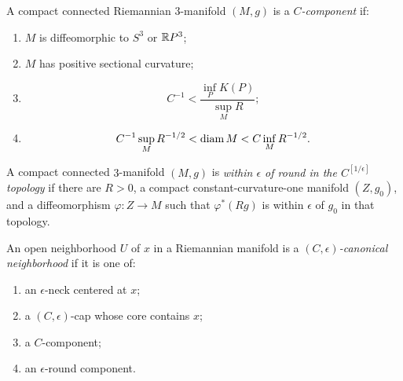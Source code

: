 \begin{definition}[$C$-component]\label{def:c-component}
\label{Ccomponent}
A compact connected Riemannian $3$-manifold $(M,g)$ is a
\emph{$C$-component} if:
\begin{enumerate}
\item[(1)] $M$ is diffeomorphic to $S^3$ or $\mathbb{R} P^3$;
\item[(2)] $M$ has positive sectional curvature;
\item[(3)]
\[
 C^{-1}<\frac{\inf_PK(P)}{\sup_MR};
\]
\item[(4)]
\[
 C^{-1}\sup_MR^{-1/2}<\operatorname{diam} M<C\inf_MR^{-1/2}.
\]
\end{enumerate}
\end{definition}

\begin{definition}\label{def:epsilon-round-component}
\label{defnepsround}
A compact connected $3$-manifold $(M,g)$ is
\emph{within $\epsilon$ of round in the $C^{[1/\epsilon]}$ topology}
if there are $R>0$, a compact constant-curvature-one manifold
$(Z,g_0)$, and a diffeomorphism $\varphi:Z\to M$ such that
$\varphi^*(Rg)$ is within $\epsilon$ of $g_0$ in that topology.
\end{definition}

\begin{definition}\label{def:canonical-neighborhood}

An open neighborhood $U$ of $x$ in a Riemannian manifold is a
\emph{$(C,\epsilon)$-canonical neighborhood} if it is one of:
\begin{enumerate}
\item[(1)] an $\epsilon$-neck centered at $x$;
\item[(2)] a $(C,\epsilon)$-cap whose core contains $x$;
\item[(3)] a $C$-component;
\item[(4)] an $\epsilon$-round component.
\end{enumerate}
\end{definition}

